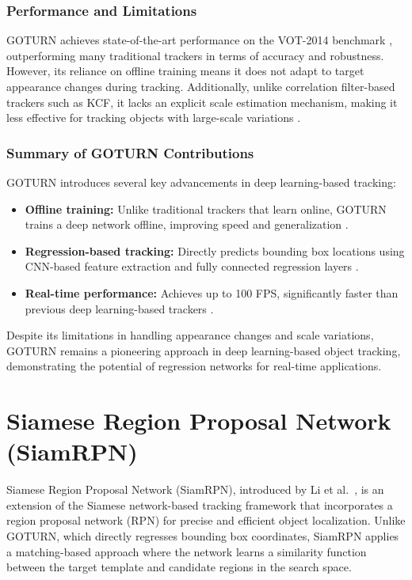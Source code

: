 \subsubsection{Performance and Limitations}
GOTURN achieves state-of-the-art performance on the VOT-2014 benchmark \cite{held2016learning}, outperforming many traditional trackers in terms of accuracy and robustness. However, its reliance on offline training means it does not adapt to target appearance changes during tracking. Additionally, unlike correlation filter-based trackers such as KCF, it lacks an explicit scale estimation mechanism, making it less effective for tracking objects with large-scale variations \cite{danelljan2016discriminative}.

\subsubsection{Summary of GOTURN Contributions}
GOTURN introduces several key advancements in deep learning-based tracking:
\begin{itemize}
    \item \textbf{Offline training:} Unlike traditional trackers that learn online, GOTURN trains a deep network offline, improving speed and generalization \cite{held2016learning}.
    \item \textbf{Regression-based tracking:} Directly predicts bounding box locations using CNN-based feature extraction and fully connected regression layers \cite{held2016learning}.
    \item \textbf{Real-time performance:} Achieves up to 100 FPS, significantly faster than previous deep learning-based trackers \cite{held2016learning}.
\end{itemize}
Despite its limitations in handling appearance changes and scale variations, GOTURN remains a pioneering approach in deep learning-based object tracking, demonstrating the potential of regression networks for real-time applications.

\section{Siamese Region Proposal Network (SiamRPN)}
Siamese Region Proposal Network (SiamRPN), introduced by Li et al.\ \cite{li2018high}, is an extension of the Siamese network-based tracking framework that incorporates a region proposal network (RPN) for precise and efficient object localization. Unlike GOTURN, which directly regresses bounding box coordinates, SiamRPN applies a matching-based approach where the network learns a similarity function between the target template and candidate regions in the search space.

